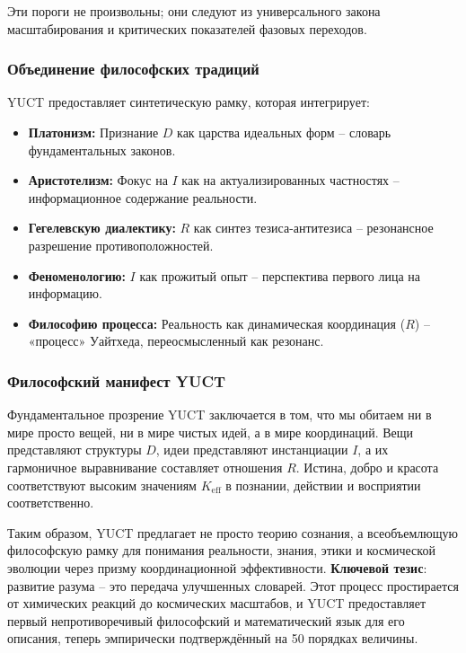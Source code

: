 \documentclass[12pt,a4paper]{article}
\newcommand{\eff}{\mathrm{eff}}
\newcommand{\Ke}{K_{\eff}}
\begin{document}
	Эти пороги не произвольны; они следуют из универсального закона масштабирования и критических показателей фазовых переходов.
	
	\subsubsection{Объединение философских традиций}
	
	YUCT предоставляет синтетическую рамку, которая интегрирует:
	\begin{itemize}
		\item \textbf{Платонизм:} Признание $D$ как царства идеальных форм – словарь фундаментальных законов.
		\item \textbf{Аристотелизм:} Фокус на $I$ как на актуализированных частностях – информационное содержание реальности.
		\item \textbf{Гегелевскую диалектику:} $R$ как синтез тезиса-антитезиса – резонансное разрешение противоположностей.
		\item \textbf{Феноменологию:} $I$ как прожитый опыт – перспектива первого лица на информацию.
		\item \textbf{Философию процесса:} Реальность как динамическая координация ($R$) – «процесс» Уайтхеда, переосмысленный как резонанс.
	\end{itemize}
	
	\subsubsection{Философский манифест YUCT}
	
	Фундаментальное прозрение YUCT заключается в том, что мы обитаем ни в мире просто вещей, ни в мире чистых идей, а в мире координаций. Вещи представляют структуры $D$, идеи представляют инстанциации $I$, а их гармоничное выравнивание составляет отношения $R$. Истина, добро и красота соответствуют высоким значениям $\Ke$ в познании, действии и восприятии соответственно.
	
	Таким образом, YUCT предлагает не просто теорию сознания, а всеобъемлющую философскую рамку для понимания реальности, знания, этики и космической эволюции через призму координационной эффективности.
	\textbf{Ключевой тезис}: развитие разума – это передача улучшенных словарей. Этот процесс простирается от химических реакций до космических масштабов, и YUCT предоставляет первый непротиворечивый философский и математический язык для его описания, теперь эмпирически подтверждённый на 50 порядках величины.
	
\end{document}
